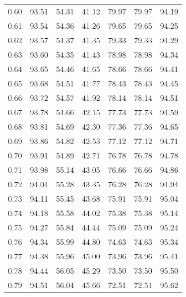 \begin{tabular}{|c|c|c|c|c|c|c|}
      0.60 &     93.51 &     54.31 &      41.12 &   79.97 &      79.97 &         94.19 \\
      0.61 &     93.54 &     54.36 &      41.26 &   79.65 &      79.65 &         94.25 \\
      0.62 &     93.57 &     54.37 &      41.35 &   79.33 &      79.33 &         94.29 \\
      0.63 &     93.60 &     54.35 &      41.43 &   78.98 &      78.98 &         94.34 \\
      0.64 &     93.65 &     54.46 &      41.65 &   78.66 &      78.66 &         94.41 \\
      0.65 &     93.68 &     54.51 &      41.77 &   78.43 &      78.43 &         94.45 \\
      0.66 &     93.72 &     54.57 &      41.92 &   78.14 &      78.14 &         94.51 \\
      0.67 &     93.78 &     54.66 &      42.15 &   77.73 &      77.73 &         94.59 \\
      0.68 &     93.81 &     54.69 &      42.30 &   77.36 &      77.36 &         94.65 \\
      0.69 &     93.86 &     54.82 &      42.53 &   77.12 &      77.12 &         94.71 \\
      0.70 &     93.91 &     54.89 &      42.71 &   76.78 &      76.78 &         94.78 \\
      0.71 &     93.98 &     55.14 &      43.05 &   76.66 &      76.66 &         94.86 \\
      0.72 &     94.04 &     55.28 &      43.35 &   76.28 &      76.28 &         94.94 \\
      0.73 &     94.11 &     55.45 &      43.68 &   75.91 &      75.91 &         95.04 \\
      0.74 &     94.18 &     55.58 &      44.02 &   75.38 &      75.38 &         95.14 \\
      0.75 &     94.27 &     55.84 &      44.44 &   75.09 &      75.09 &         95.24 \\
      0.76 &     94.34 &     55.99 &      44.80 &   74.63 &      74.63 &         95.34 \\
      0.77 &     94.38 &     55.96 &      45.00 &   73.96 &      73.96 &         95.41 \\
      0.78 &     94.44 &     56.05 &      45.29 &   73.50 &      73.50 &         95.50 \\
      0.79 &     94.51 &     56.04 &      45.66 &   72.51 &      72.51 &         95.62 \\

\end{tabular}
